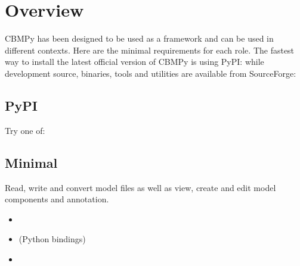 \documentclass[letterpaper,10pt,english]{sphinxmanual}
\begin{document}
\section{Overview}
\label{\detokenize{install_doc:overview}}
\sphinxAtStartPar
CBMPy has been designed to be used as a framework and can be used in different contexts. Here are the
minimal requirements for each role. The fastest way to install the latest official version of CBMPy is
using PyPI:  while development source, binaries, tools and utilities are available from
SourceForge: 


\subsection{PyPI}
\label{\detokenize{install_doc:pypi}}
\sphinxAtStartPar
Try one of:

\begin{sphinxVerbatim}[commandchars=\\\{\}]
  
 
\end{sphinxVerbatim}


\subsection{Minimal}
\label{\detokenize{install_doc:minimal}}
\sphinxAtStartPar
Read, write and convert model files as well as view, create and edit model components and annotation.
\begin{itemize}
\item {} 
\sphinxAtStartPar
{}

\item {} 
\sphinxAtStartPar
{} (Python bindings)

\item {} 
\sphinxAtStartPar
{}

\end{itemize}
\end{document}
